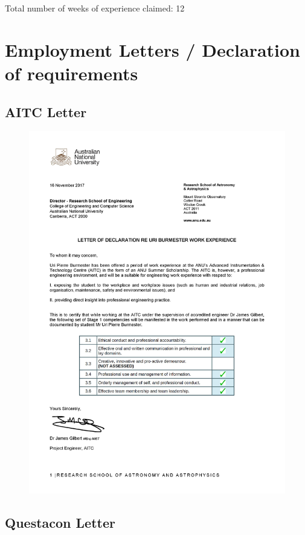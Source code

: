 \documentclass[11pt]{article}
\begin{document}
Total number of weeks of experience claimed: 12

\newpage

\section{Employment Letters / Declaration of requirements}
\subsection{AITC Letter}

\begin{figure}[!h] \centering
  \includegraphics[width=0.9\linewidth]{upb_offer-signed.jpg}
\end{figure}

\newpage

\subsection{Questacon Letter}
\end{document}
